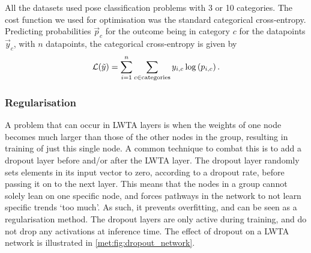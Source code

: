         All the datasets used pose classification problems with 3 or 10 categories. The cost function we used for optimisation was the standard categorical cross-entropy. Predicting probabilities $\vec{p}_c$ for the outcome being in category $c$ for the datapoints $\vec{y}_c$, with $n$ datapoints, the categorical cross-entropy is given by
        \begin{align}
            \mathcal{L}(\tilde{y}) = \sum_{i=1}^n \sum_{c \in \mathrm{categories}} y_{i,c} \log\left(p_{i,c}\right).
        \end{align}


    \subsubsection{Regularisation}

        A problem that can occur in LWTA layers is when the weights of one node becomes much larger than those of the other nodes in the group, resulting in training of just this single node. A common technique to combat this is to add a dropout layer before and/or after the LWTA layer. The dropout layer randomly sets elements in its input vector to zero, according to a dropout rate, before passing it on to the next layer. This means that the nodes in a group cannot solely lean on one specific node, and forces pathways in the network to not learn specific trends `too much'. As such, it prevents overfitting, and can be seen as a regularisation method. The dropout layers are only active during training, and do not drop any activations at inference time. The effect of dropout on a LWTA network is illustrated in \cref{met:fig:dropout_network}.

